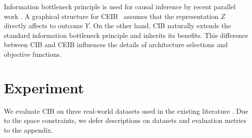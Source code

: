 \documentclass{article}
\begin{document}
     Information bottleneck principle is used for causal inference by recent parallel work \cite{parbhoo2018causal}. A graphical structure for CEIB~\cite{parbhoo2018causal} assumes that the representation $Z$ directly affects to outcome $Y$. On the other hand, CIB naturally extends the standard information bottleneck principle and inherits its benefits. This difference between CIB and CEIB influences the details of architecture selections and objective functions. 
     


\section{Experiment}
We evaluate CIB on three real-world datasets used in the existing literature \cite{johansson16, Shalit17, Louizos17}. Due to the space constraints, we defer descriptions on datasets and evaluation metrics to the appendix. 
\end{document}
